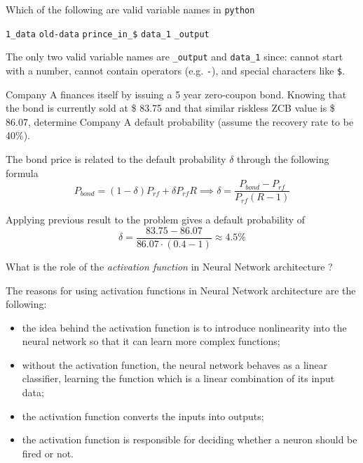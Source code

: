 \documentclass[12pt,a4paper]{exam}
\begin{document}
\begin{questions}
\question
Which of the following are valid variable names in \texttt{python} 

\begin{checkboxes}
\choice \texttt{1\_data}
\choice \texttt{old-data}
\choice \texttt{prince\_in\_\$}
\choice \texttt{data\_1}
\choice \texttt{\_output}
\end{checkboxes}
\begin{solution}
The only two valid variable names are \texttt{\_output} and \texttt{data\_1} since: cannot start with a number, cannot contain operators (e.g. \texttt{-}), and special characters like \texttt{\$}.
\end{solution}

\question
Company A finances itself by issuing a 5 year zero-coupon bond. Knowing that the bond is currently sold at \$ 83.75 and that similar riskless ZCB value is \$ 86.07, determine Company A default probability (assume the recovery rate to be 40\%).
\fillwithlines{3cm}
\begin{solution}
The bond price is related to the default probability $\delta$ through the following formula
\begin{equation*}
  P_{bond} = (1-\delta)P_{rf} + \delta P_{rf} R \implies \delta = \frac{P_{bond}-P_{rf}}{P_{rf}(R-1)}
\end{equation*}

Applying previous result to the problem gives a default probability of
\begin{equation*}
  \delta = \frac{83.75-86.07}{86.07\cdot(0.4-1)} \approx 4.5\% 
\end{equation*}
\end{solution}


\question
What is the role of the \emph{activation function} in Neural Network architecture ?
\fillwithlines{3cm}
\begin{solution}
The reasons for using activation functions in Neural Network architecture are the following:
\begin{itemize}
\item the idea behind the activation function is to introduce nonlinearity into the neural network so that it can learn more complex functions;
\item without the activation function, the neural network behaves as a linear classifier, learning the function which is a linear combination of its input data;
\item the activation function converts the inputs into outputs;
\item the activation function is responsible for deciding whether a neuron should be fired or not.
\end{itemize}
\end{solution}

\end{questions}
\end{document}
